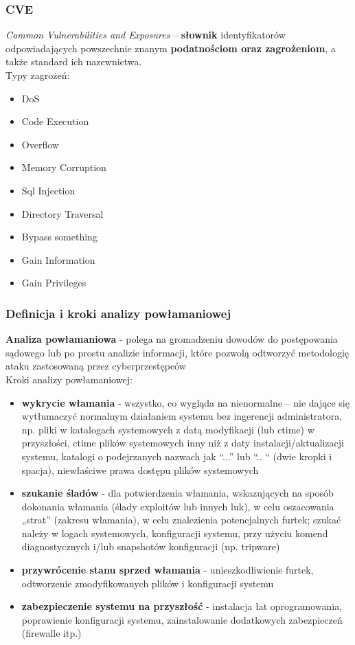 \subsubsection{CVE}

\textit{Common Vulnerabilities and Exposures} – \textbf{słownik} identyfikatorów odpowiadających powszechnie znanym \textbf{podatnościom oraz zagrożeniom}, a także standard ich nazewnictwa. \\

Typy zagrożeń: 

\begin{itemize}
	\item DoS
	\item Code Execution
	\item Overflow	
	\item Memory Corruption	
	\item Sql Injection	
	\item Directory Traversal
	\item Bypass something	
	\item Gain Information	
	\item Gain Privileges
\end{itemize}

\subsubsection{Definicja i kroki analizy powłamaniowej}

\textbf{Analiza powłamaniowa} - polega na gromadzeniu dowodów do postępowania sądowego lub po prostu analizie informacji, które pozwolą odtworzyć metodologię ataku zastosowaną przez cyberprzestępców \\

Kroki analizy powłamaniowej: 

\begin{itemize}
	\item \textbf{wykrycie włamania} - wszystko, co wygląda na nienormalne – nie dające się wytłumaczyć normalnym działaniem systemu bez ingerencji administratora, np. pliki w katalogach systemowych z datą modyfikacji (lub ctime) w przyszłości, ctime plików systemowych inny niż z daty instalacji/aktualizacji systemu, katalogi o podejrzanych nazwach jak “...” lub “.. “ (dwie kropki i spacja), niewłaściwe prawa dostępu plików systemowych 
	\item \textbf{szukanie śladów} - dla potwierdzenia włamania, wskazujących na sposób dokonania włamania (ślady exploitów lub innych luk), w celu oszacowania „strat” (zakresu włamania), w celu znalezienia potencjalnych furtek; szukać należy w logach systemowych, konfiguracji systemu, przy użyciu komend diagnostycznych i/lub snapshotów konfiguracji (np. tripware) 
	\item \textbf{przywrócenie stanu sprzed włamania} - unieszkodliwienie furtek, odtworzenie zmodyfikowanych plików i konfiguracji systemu 
	\item \textbf{zabezpieczenie systemu na przyszłość} - instalacja łat oprogramowania, poprawienie konfiguracji systemu, zainstalowanie dodatkowych zabezpieczeń (firewalle itp.) 
\end{itemize}

